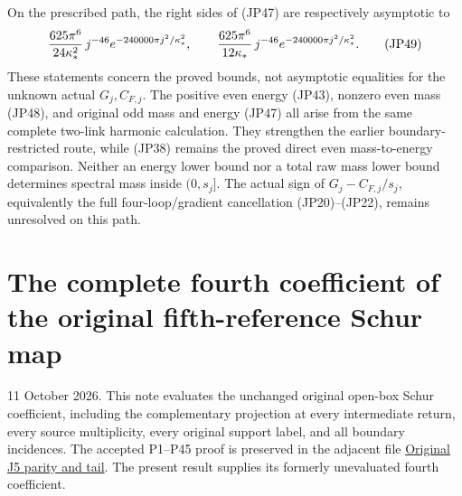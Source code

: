 \documentclass[11pt]{article}
\begin{document}
On the prescribed path, the right sides of (JP47) are respectively
asymptotic to
\[
 {625\pi^6\over24\kappa_*^2}\,
       j^{-46}e^{-240000\pi j^2/\kappa_*^2},
 \qquad
 {625\pi^6\over12\kappa_*}\,
       j^{-46}e^{-240000\pi j^2/\kappa_*^2}.
 \tag{JP49}
\]
These statements concern the proved bounds, not asymptotic
equalities for the unknown actual \(G_j,C_{F,j}\).
The positive even energy (JP43), nonzero even mass (JP48), and
original odd mass and energy (JP47) all arise from the same complete
two-link harmonic calculation. They strengthen the earlier
boundary-restricted route, while (JP38) remains the proved direct
even mass-to-energy comparison. Neither an energy lower bound
nor a total raw mass lower bound determines spectral mass inside
\((0,s_j]\). The actual sign of
\(G_j-C_{F,j}/s_j\), equivalently the full four-loop/gradient
cancellation (JP20)–(JP22), remains unresolved on this path.
\clearpage
\section*{The complete fourth coefficient of the original fifth-reference Schur map}

11 October 2026. This note evaluates the unchanged original open-box Schur coefficient, including the complementary projection at every intermediate return, every source multiplicity, every original support label, and all boundary incidences. The accepted P1–P45 proof is preserved in the adjacent file \href{https://github.com/KokunoYumeto/yang-mills-interacting-workbench/blob/main/yang-mills/continuations/20261011-central-signs-shrinking-window/fourth_return/../ORIGINAL_J5_PARITY_AND_TAIL.md}{Original J5 parity and tail}. The present result supplies its formerly unevaluated fourth coefficient.
\end{document}
